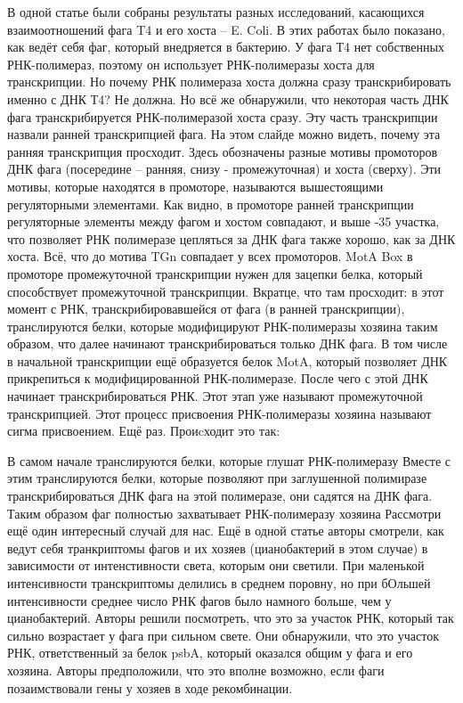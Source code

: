 \documentclass[14pt]{extarticle}
\begin{document}
    \par{В одной статье были собраны результаты разных исследований, касающихся взаимоотношений фага T4 и его хоста – E.
    Coli. В этих работах было показано, как ведёт себя фаг, который внедряется в бактерию.
	У фага Т4 нет собственных РНК-полимераз, поэтому он использует РНК-полимеразы хоста для транскрипции. Но почему РНК
	полимераза хоста должна сразу транскрибировать именно с ДНК Т4? Не должна. Но всё же обнаружили, что некоторая часть
	ДНК фага транскрибируется РНК-полимеразой хоста сразу. Эту часть транскрипции назвали ранней транскрипцией фага. На
	этом слайде можно видеть, почему эта ранняя транскрипция просходит. Здесь обозначены разные мотивы промоторов ДНК
	фага (посередине – ранняя, снизу - промежуточная) и хоста (сверху). Эти мотивы, которые находятся в промоторе,
	называются вышестоящими регуляторными элементами. Как видно, в промоторе ранней транскрипции регуляторные элементы
	между фагом и хостом совпадают, и выше -35 участка, что позволяет РНК полимеразе цепляться за ДНК фага также хорошо,
	как за ДНК хоста.  Всё, что до мотива TGn совпадает у всех промоторов. MotA Box в промоторе промежуточной
	транскрипции нужен для зацепки белка, который способствует промежуточной транскрипции. Вкратце, что там просходит: в
	этот момент с РНК, транскрибировавшейся от фага (в ранней транскрипции), транслируются белки, которые модифицируют
	РНК-полимеразы хозяина таким образом, что далее начинают транскрибироваться только ДНК фага. В том числе в начальной
	транскрипции ещё образуется белок MotA, который позволяет ДНК прикрепиться к модифицированной РНК-полимеразе. После
	чего с этой ДНК начинает транскрибироваться РНК. Этот этап уже называют промежуточной транскрипцией. Этот процесс
	присвоения РНК-полимеразы хозяина называют сигма присвоением. Ещё раз. Проиcходит это так:}

	\par{В самом начале транслируются белки, которые глушат РНК-полимеразу Вместе с этим транслируются белки, которые
	позволяют при заглушенной полимиразе транскрибироваться ДНК фага на этой полимеразе, они садятся на ДНК фага. Таким
	образом фаг полностью захватывает РНК-полимеразу хозяина Рассмотри ещё один интересный случай для нас. Ещё в одной
	статье авторы смотрели, как ведут себя транкриптомы фагов и их хозяев (цианобактерий в этом случае) в зависимости от
	интенстивности света, которым они светили. При маленькой интенсивности транскриптомы делились в среднем поровну, но
	при бОльшей интенсивности среднее число РНК фагов было намного больше, чем у цианобактерий. Авторы решили
	посмотреть, что это за участок РНК, который так сильно возрастает у фага при сильном свете. Они обнаружили, что это
	участок РНК, ответственный за белок psbA, который оказался общим у фага и его хозяина. Авторы предположили, что это
	вполне возможно, если фаги позаимствовали гены у хозяев в ходе рекомбинации.}
	
\end{document}
